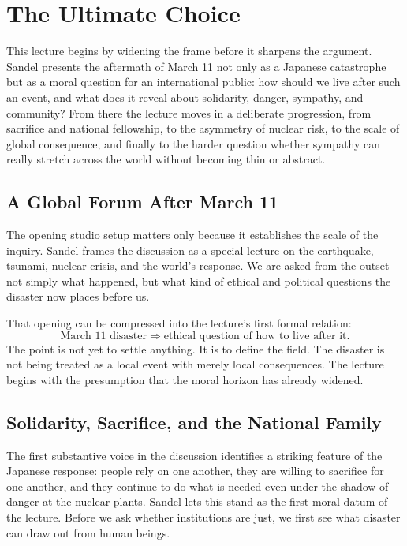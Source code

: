 \chapter{The Ultimate Choice}

This lecture begins by widening the frame before it sharpens the argument. Sandel presents the aftermath of March 11 not only as a Japanese catastrophe but as a moral question for an international public: how should we live after such an event, and what does it reveal about solidarity, danger, sympathy, and community? From there the lecture moves in a deliberate progression, from sacrifice and national fellowship, to the asymmetry of nuclear risk, to the scale of global consequence, and finally to the harder question whether sympathy can really stretch across the world without becoming thin or abstract.

\section{A Global Forum After March 11}

The opening studio setup matters only because it establishes the scale of the inquiry. Sandel frames the discussion as a special lecture on the earthquake, tsunami, nuclear crisis, and the world's response. We are asked from the outset not simply what happened, but what kind of ethical and political questions the disaster now places before us.

That opening can be compressed into the lecture's first formal relation:
\begin{equation}
\text{March 11 disaster}
\Longrightarrow
\text{ethical question of how to live after it}.
\end{equation}
The point is not yet to settle anything. It is to define the field. The disaster is not being treated as a local event with merely local consequences. The lecture begins with the presumption that the moral horizon has already widened.

\section{Solidarity, Sacrifice, and the National Family}

The first substantive voice in the discussion identifies a striking feature of the Japanese response: people rely on one another, they are willing to sacrifice for one another, and they continue to do what is needed even under the shadow of danger at the nuclear plants. Sandel lets this stand as the first moral datum of the lecture. Before we ask whether institutions are just, we first see what disaster can draw out from human beings.

